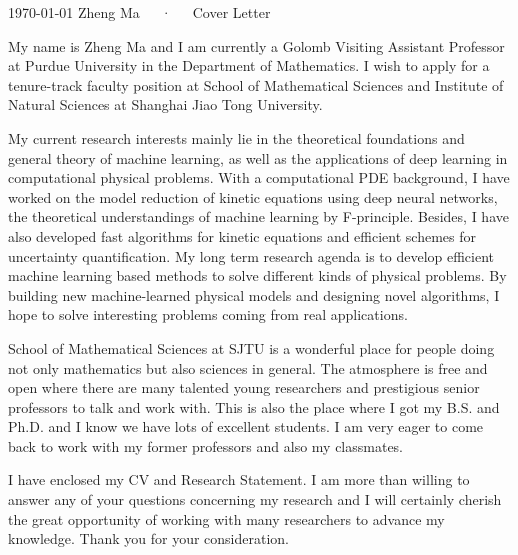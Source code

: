 \documentclass[11pt, a4paper]{awesome-cv}
\begin{document}
\makecvheader[C]

\makecvfooter
  {\today}
  {Zheng Ma~~~·~~~Cover Letter}
  {}

\makelettertitle

\begin{cvletter}

My name is Zheng Ma and I am currently a Golomb Visiting Assistant Professor at Purdue University in the Department of Mathematics. I wish to apply for a tenure-track faculty position at School of Mathematical Sciences and Institute of Natural Sciences at Shanghai Jiao Tong University.

My current research interests mainly lie in the theoretical foundations and general theory of machine learning, as well as the applications of deep learning in computational physical problems. With a computational PDE background, I have worked on the model reduction of kinetic equations using deep neural networks, the theoretical understandings of machine learning by F-principle. Besides, I have also developed fast algorithms for kinetic equations and efficient schemes for uncertainty quantification. My long term research agenda is to develop efficient machine learning based methods to solve different kinds of physical problems. By building new machine-learned physical models and designing novel algorithms, I hope to solve interesting problems coming from real applications.

School of Mathematical Sciences at SJTU is a wonderful place for people doing not only mathematics but also sciences in general. The atmosphere is free and open where there are many talented young researchers and prestigious senior professors to talk and work with. This is also the place where I got my B.S. and Ph.D. and I know we have lots of excellent students. I am very eager to come back to work with my former professors and also my classmates.

I have enclosed my CV and Research Statement. I am more than willing to answer any of your questions concerning my research and I will certainly cherish the great opportunity of working with many researchers to advance my knowledge. Thank you for your consideration.

\end{cvletter}

\makeletterclosing
\end{document}
